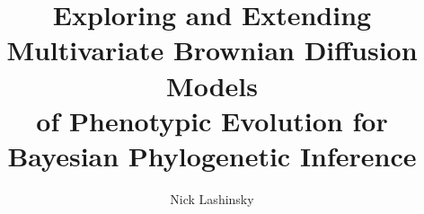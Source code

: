 \documentclass[12pt,finalcls]{ucdavisthesis}
\title          {Exploring and Extending Multivariate Brownian Diffusion Models \\of Phenotypic Evolution for Bayesian Phylogenetic Inference}
\author         {Nick Lashinsky}
\begin{document}

%


\makeintropages %










\nocite{*}


\end{document}
